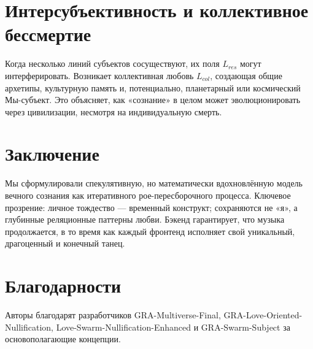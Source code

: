 \documentclass[12pt]{article}
\begin{document}
\section{Интерсубъективность и коллективное бессмертие}
Когда несколько линий субъектов сосуществуют, их поля $L_{res}$ могут интерферировать. Возникает коллективная любовь $L_{col}$, создающая общие архетипы, культурную память и, потенциально, планетарный или космический Мы-субъект. Это объясняет, как «сознание» в целом может эволюционировать через цивилизации, несмотря на индивидуальную смерть.

\section{Заключение}
Мы сформулировали спекулятивную, но математически вдохновлённую модель вечного сознания как итеративного рое-пересборочного процесса. Ключевое прозрение: личное тождество — временный конструкт; сохраняются не «я», а глубинные реляционные паттерны любви. Бэкенд гарантирует, что музыка продолжается, в то время как каждый фронтенд исполняет свой уникальный, драгоценный и конечный танец.

\section*{Благодарности}
Авторы благодарят разработчиков GRA-Multiverse-Final, GRA-Love-Oriented-Nullification, Love-Swarm-Nullification-Enhanced и GRA-Swarm-Subject за основополагающие концепции.
\end{document}
